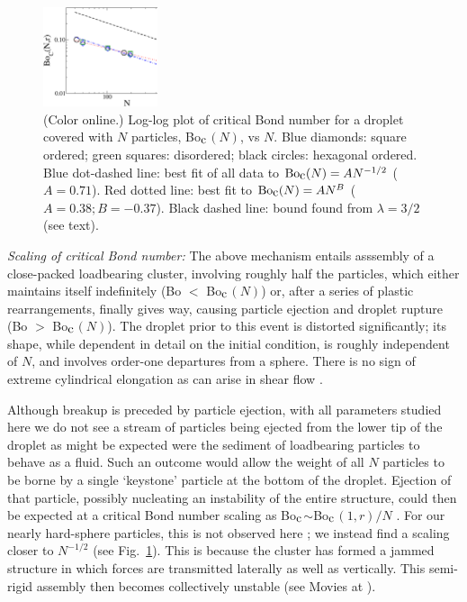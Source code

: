 \documentclass[aps,prl,superscriptaddress,twocolumn,showpacs,floatfix]{revtex4-1}
\newcommand{\Bocm}{Bo$_{\hbox{\rm c}}$}
\begin{document}
\begin{figure}[tbph]
\centering
\vspace{.1in}
\includegraphics[width=0.3\textwidth]{figure3_ks.eps}
\caption{(Color online.) Log-log plot of critical Bond number for a droplet covered with $N$ particles, \Bocm $(N)$, vs $N$. Blue diamonds: square ordered; green squares: disordered; black circles: hexagonal ordered. Blue dot-dashed line: best fit of all data to  ${\rm Bo}_{\hbox{\rm c}}(N) = A N^{-1/2}$ ($A = 0.71$). Red dotted line: best fit to ${\rm Bo}_{\hbox{\rm c}}(N) = A N^{B}$ ($A = 0.38; B=-0.37$). Black dashed line: bound found from $\lambda=3/2$ (see text).}
\label{fig:scalingN0.5}
\end{figure}



\textit{Scaling of critical Bond number:}
The above mechanism entails asssembly of a close-packed loadbearing cluster, involving roughly half the particles, which either maintains itself indefinitely (Bo $<$ \Bocm $(N)$) or, after a series of plastic rearrangements, 
finally gives way, causing particle ejection and droplet rupture (Bo $>$ \Bocm $(N)$). The droplet prior to this event is distorted significantly; its shape, while dependent in detail on the initial condition, is roughly independent of $N$, and involves order-one departures from a sphere. There is no sign of extreme cylindrical elongation as can arise in shear flow \cite{Bentley,Lyn}.

Although breakup is preceded by particle ejection, with all parameters studied here we do not see a stream of particles being ejected from the lower tip of the droplet as might be expected were the sediment of loadbearing particles to behave as a fluid. Such an outcome would allow the weight of all $N$ particles to be borne by a single `keystone' particle at the bottom of the droplet. Ejection of that particle, possibly nucleating an instability of the entire structure, could then be expected at a critical Bond number scaling as \Bocm $\sim$\Bocm $(1,r)/N$ \cite{kim:one}. For our nearly hard-sphere particles\cite{supmat}, this is not observed here \cite{Foot2}; we instead find a scaling closer to $N^{-1/2}$ (see Fig.~\ref{fig:scalingN0.5}). This is because the cluster has formed a jammed structure in which forces are transmitted laterally as well as vertically. This semi-rigid assembly then becomes collectively unstable (see Movies at \cite{supmat}).
\end{document}
